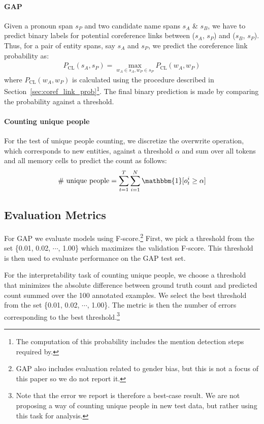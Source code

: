 \documentclass[12pt]{thesis-umich}[thesis]
\begin{document}
\paragraph{GAP} Given a pronoun span $s_P$ and two candidate name spans $s_A$ \&  $s_B$, we
have to predict binary labels for potential coreference links between ($s_A$, $s_P$) and ($s_B$, $s_P$). Thus, for a pair of entity spans, say $s_A$ and $s_P$, we predict the coreference link probability as:
\begin{align*}
    P_{\mathrm{CL}}(s_A, s_P) = \max_{w_A \in s_A, w_P \in s_P} P_{\mathrm{CL}}(w_A, w_P)
\end{align*}
where $P_{\mathrm{CL}}(w_A, w_P)$ is calculated using the procedure described in Section~\ref{sec:coref_link_prob}\footnote{The computation of this probability includes the mention detection steps required by\citet{webster2018gap}.}. The final binary prediction is made by comparing the probability against a threshold.





\paragraph{Counting unique people}
For the test of unique
people counting, we discretize the overwrite operation, which corresponds to new entities, against a threshold $\alpha$ and sum over all
tokens and all
memory cells to predict the count as follows:\vspace{-0.02in}
$$\text{\# unique people} = \sum_{t=1}^T\sum_{i=1}^N \mathbbm{1}[o^i_t \geq \alpha] $$




\subsection{Evaluation Metrics}
For GAP we evaluate models using F-score.\footnote{GAP also includes evaluation related to gender bias, but this is not a focus of this paper so we do not report it.}
First, we pick a threshold from the set \{0.01, 0.02, $\cdots$, 1.00\} which maximizes the validation F-score.
This threshold is then used to evaluate performance on the GAP test set.





For the interpretability task of counting unique people, we
choose a threshold that minimizes the absolute difference between ground truth count and predicted count summed over the 100 annotated examples.
We select the best threshold from the set \{0.01, 0.02, $\cdots$, 1.00\}.
The metric is then the number of errors corresponding to the best threshold.\footnote{Note that the error we report is therefore a best-case result.  We are not proposing a way of counting unique people in new test data, but rather using this task for analysis.}
\end{document}
